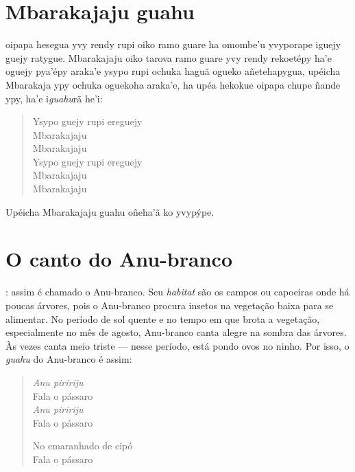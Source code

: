 \chapter{Mbarakajaju guahu}

 oipapa hesegua yvy rendy rupi oiko ramo guare ha omombe'u
yvyporape iguejy guejy ratygue. Mbarakajaju oiko tarova ramo guare yvy
rendy rekoetépy ha'e oguejy pya'épy araka'e ysypo rupi ochuka haguã
ogueko añetehapygua, upéicha Mbarakaja ypy ochuka oguekoha araka'e, ha
upéa hekokue oipapa chupe ñande ypy, ha'e i\textit{guahu}rã he'i:


\begin{verse}
Ysypo guejy rupi ereguejy\\
Mbarakajaju\\
Mbarakajaju\\

Ysypo guejy rupi ereguejy\\
Mbarakajaju\\
Mbarakajaju
\end{verse}


Upéicha Mbarakajaju guahu oñeha'ã ko yvypýpe.

\chapter{O canto do Anu-branco}

: assim é chamado o Anu-branco. Seu \textit{habitat} são os campos
ou capoeiras onde há poucas árvores, pois o Anu-branco procura insetos
na vegetação baixa para se alimentar. No período de sol quente e no
tempo em que brota a vegetação, especialmente no mês de agosto,
Anu-branco canta alegre na sombra das árvores. Às vezes canta meio
triste --- nesse período, está pondo ovos no ninho. Por isso, o
\textit{guahu} do Anu-branco é assim:

\begin{verse}
\textit{Anu piririju}\footnotemark{}\\
Fala o pássaro\\
\textit{Anu piririju}\\
Fala o pássaro

No emaranhado de cipó\footnotemark{}\\
Fala o pássaro
\end{verse}



